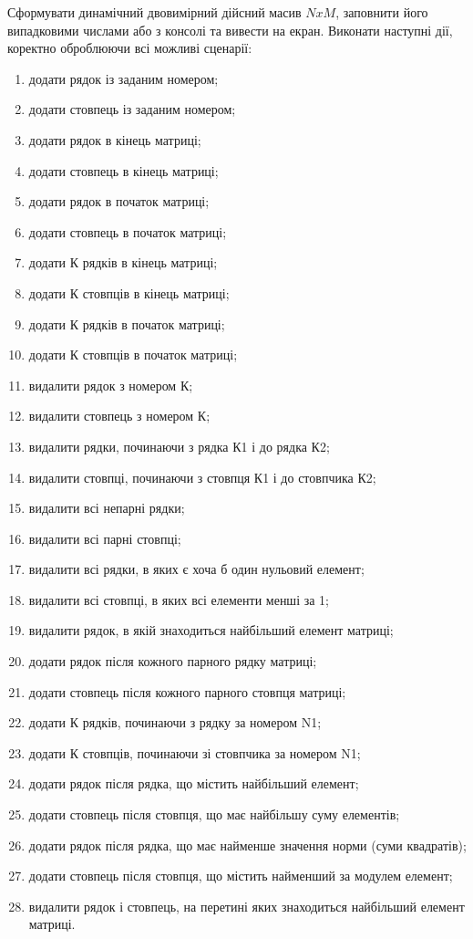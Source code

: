 \documentclass[]{article}
\makeatletter
\newcommand{\xslalph}[1]{\expandafter\@xslalph\csname c@#1\endcsname}
\newcommand{\@xslalph}[1]{%
    \ifcase#1\or а\or б\or в\or г\or д\or e\or є\or ж\or з\or i%
    \or й\or к\or л\or м\or н\or о\or п\or р\or с\or т%
    \or у\or ф\or х\or ц\or ч\or ш\or ю\or я\or аа\or бб\or вв%
    \else\@ctrerr\fi%
}
\makeatother
\begin{document}
\begin{enumerate}
\begin{enumerate}[label=\xslalph*)]
\begin{enumerate}
\begin{enumerate}[label=\xslalph*)]
\begin{enumerate}
Сформувати динамічний двовимірний дійсний масив $NxM$, заповнити його випадковими
числами або з консолі та вивести на екран. Виконати наступні дії, коректно оброблюючи 
всі можливі сценарії:

\begin{enumerate}[label=\xslalph*)]
\item
  додати рядок із заданим номером;
\item
  додати стовпець із заданим номером;
\item
  додати рядок в кінець матриці;
\item
  додати стовпець в кінець матриці;
\item
  додати рядок в початок матриці;
\item
  додати стовпець в початок матриці;
\item
  додати К рядків в кінець матриці;
\item
  додати К стовпців в кінець матриці;
\item
  додати К рядків в початок матриці;
\item
  додати К стовпців в початок матриці;
\item
  видалити рядок з номером К;
\item
  видалити стовпець з номером К;
\item
  видалити рядки, починаючи з рядка К1 і до рядка К2;
\item
  видалити стовпці, починаючи з стовпця К1 і до стовпчика К2;
\item
  видалити всі непарні рядки;
\item
  видалити всі парні стовпці;
\item
  видалити всі рядки, в яких є хоча б один нульовий елемент;
\item
  видалити всі стовпці, в яких всі елементи менші за 1;
\item
  видалити рядок, в якій знаходиться найбільший елемент матриці;
\item
  додати рядок після кожного парного рядку матриці;
\item
  додати стовпець після кожного парного стовпця матриці;
\item
  додати К рядків, починаючи з рядку за номером N1;
\item
  додати К стовпців, починаючи зі стовпчика за номером N1;
\item
  додати рядок після рядка, що містить найбільший елемент;
\item
  додати стовпець після стовпця, що має найбільшу суму елементів;
\item
  додати рядок після рядка, що має найменше значення норми (суми квадратів);
\item
  додати стовпець після стовпця, що містить найменший за модулем елемент;
\item
  видалити рядок і стовпець, на перетині яких знаходиться найбільший
  елемент матриці.


\end{enumerate}
\end{enumerate}
\end{enumerate}
\end{enumerate}
\end{enumerate}
\end{enumerate}
\end{document}
